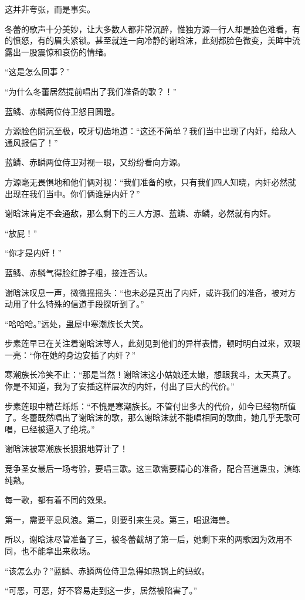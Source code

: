 \begin{this_body}
这并非夸张，而是事实。

冬蕾的歌声十分美妙，让大多数人都非常沉醉，惟独方源一行人却是脸色难看，有的愤怒，有的眉头紧锁。甚至就连一向冷静的谢晗沫，此刻都脸色微变，美眸中流露出一股震惊和哀伤的情绪。

“这是怎么回事？”

“为什么冬蕾居然提前唱出了我们准备的歌？！”

蓝鳞、赤鳞两位侍卫怒目圆瞪。

方源脸色阴沉至极，咬牙切齿地道：“这还不简单？我们当中出现了内奸，给敌人通风报信了！”

蓝鳞、赤鳞两位侍卫对视一眼，又纷纷看向方源。

方源毫无畏惧地和他们俩对视：“我们准备的歌，只有我们四人知晓，内奸必然就出现在我们当中。你们俩谁是内奸？”

谢晗沫肯定不会通敌，那么剩下的三人方源、蓝鳞、赤鳞，必然就有内奸。

“放屁！”

“你才是内奸！”

蓝鳞、赤鳞气得脸红脖子粗，接连否认。

谢晗沫叹息一声，微微摇摇头：“也未必是真出了内奸，或许我们的准备，被对方动用了什么特殊的信道手段探听到了。”

“哈哈哈。”远处，蛊屋中寒潮族长大笑。

步素莲早已在关注着谢晗沫等人，此刻见到他们的异样表情，顿时明白过来，双眼一亮：“你在她的身边安插了内奸？”

寒潮族长冷笑不止：“那是当然！谢晗沫这小姑娘还太嫩，想跟我斗，太天真了。你是不知道，我为了安插这样层次的内奸，付出了巨大的代价。”

步素莲眼中精芒烁烁：“不愧是寒潮族长。不管付出多大的代价，如今已经物所值了。冬蕾既然唱出了谢晗沫的歌，那么谢晗沫就不能唱相同的歌曲，她几乎无歌可唱，已经被逼入了绝境。”

谢晗沫被寒潮族长狠狠地算计了！

竞争圣女最后一场考验，要唱三歌。这三歌需要精心的准备，配合音道蛊虫，演练纯熟。

每一歌，都有着不同的效果。

第一，需要平息风浪。第二，则要引来生灵。第三，唱退海兽。

所以，谢晗沫尽管准备了三，被冬蕾截胡了第一后，她剩下来的两歌因为效用不同，也不能拿出来救场。

“该怎么办？”蓝鳞、赤鳞两位侍卫急得如热锅上的蚂蚁。

“可恶，可恶，好不容易走到这一步，居然被陷害了。”


\end{this_body}
